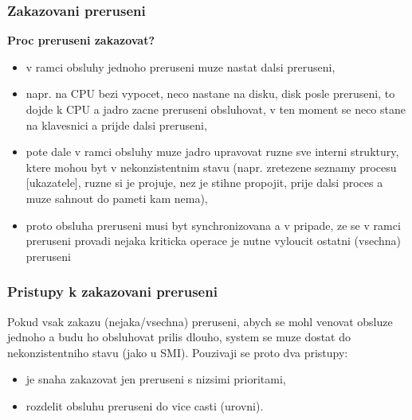 \documentclass[a4paper, 11pt]{article}
\begin{document}
\subsubsection{Zakazovani preruseni}
\textbf{Proc preruseni zakazovat?}
\begin{itemize}
    \item v ramci obsluhy jednoho preruseni muze nastat dalsi preruseni,
    \item napr. na CPU bezi vypocet, neco nastane na disku, disk posle preruseni, to dojde k CPU a jadro zacne preruseni obsluhovat, v ten moment se neco stane na klavesnici a prijde dalsi preruseni,
    \item pote dale v ramci obsluhy muze jadro upravovat ruzne sve interni struktury, ktere mohou byt v nekonzistentnim stavu (napr. zretezene seznamy procesu [ukazatele], ruzne si je projuje, nez je stihne propojit, prije dalsi proces a muze sahnout do pameti kam nema),
    \item proto obsluha preruseni musi byt synchronizovana a v pripade, ze se v ramci preruseni provadi nejaka kriticka operace je nutne vyloucit ostatni (vsechna) preruseni \\
\end{itemize}

\newpage

\subsubsection{Pristupy k zakazovani preruseni}

Pokud vsak zakazu (nejaka/vsechna) preruseni, abych se mohl venovat obsluze jednoho a budu ho obsluhovat prilis dlouho, system se muze dostat do nekonzistentniho stavu (jako u SMI). Pouzivaji se proto dva pristupy:
\begin{itemize}
    \item je snaha zakazovat jen preruseni s nizsimi prioritami,
    \item rozdelit obsluhu preruseni do vice casti (urovni).
\end{itemize}
\end{document}
